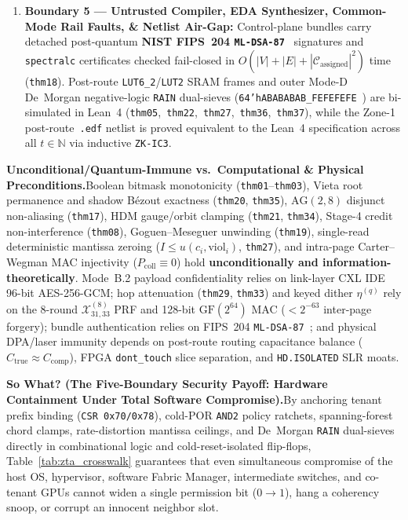 \documentclass[11pt,letterpaper]{article}
\theoremstyle{spectralthm}
\begin{document}
\begin{enumerate}
  \item \textbf{Boundary 5 --- Untrusted Compiler, EDA Synthesizer, Common-Mode Rail Faults, \& Netlist Air-Gap:} Control-plane bundles carry detached post-quantum \textbf{NIST FIPS~204 \texttt{ML-DSA-87}}~\cite{fips204mldsa} signatures and \texttt{spectralc} certificates checked fail-closed in $O(|V| \allowbreak+ |E| \allowbreak+ |\mathcal{C}_{\mathrm{assigned}}|^2)$ time (\texttt{thm18}). Post-route \mbox{\texttt{LUT6\_2}}/\texttt{LUT2} SRAM frames and outer Mode-D De~Morgan negative-logic \texttt{RAIN} dual-sieves (\texttt{64'hABABABAB\_FEFEFEFE}~\cite{mitra2000commonmode}) are bi-simulated in Lean~4 (\texttt{thm05},\allowbreak\ \texttt{thm22},\allowbreak\ \texttt{thm27},\allowbreak\ \texttt{thm36},\allowbreak\ \texttt{thm37}), while the Zone-1 post-route~\texttt{.edf} netlist is proved equivalent to the Lean~4 specification across all $t \in \mathbb{N}$ via inductive \texttt{ZK-IC3}.
\end{enumerate}

\noindent\textbf{Unconditional/Quantum-Immune vs.\ Computational \& Physical Preconditions.}\;Boolean bitmask monotonicity (\texttt{thm01}--\texttt{thm03}), Vieta root permanence and shadow B\'{e}zout exactness (\texttt{thm20}, \texttt{thm35}), $\mathrm{AG}(2,8)$ disjunct non-aliasing (\texttt{thm17}), HDM gauge/orbit clamping (\texttt{thm21}, \texttt{thm34}), Stage-4 credit non-interference (\texttt{thm08}), Goguen--Meseguer unwinding (\texttt{thm19}), single-read deterministic mantissa zeroing ($I \le u(c_i,\mathrm{viol}_i)$, \texttt{thm27}), and intra-page Carter--Wegman MAC injectivity ($P_{\mathrm{coll}} \equiv 0$) hold \textbf{unconditionally and information-theoretically}. Mode~B.2 payload confidentiality relies on link-layer CXL IDE 96-bit AES-256-GCM; hop attenuation (\texttt{thm29}, \texttt{thm33}) and keyed dither $\eta^{(q)}$ rely on the 8-round $\mathcal{X}_{31,33}^{(8)}$ PRF and 128-bit $\mathrm{GF}(2^{64})$ MAC ($<2^{-63}$ inter-page forgery); bundle authentication relies on FIPS~204 \texttt{ML-DSA-87}~\cite{fips204mldsa}; and physical DPA/laser immunity depends on post-route routing capacitance balance ($C_{\mathrm{true}} \approx C_{\mathrm{comp}}$), FPGA \texttt{dont\_touch} slice separation, and \texttt{HD.ISOLATED} SLR moats.

\noindent\textbf{So What? (The Five-Boundary Security Payoff: Hardware Containment Under Total Software Compromise).}\;By anchoring tenant prefix binding (\texttt{CSR 0x70/0x78}), cold-POR \texttt{AND2} policy ratchets, spanning-forest chord clamps, rate-distortion mantissa ceilings, and De~Morgan \texttt{RAIN} dual-sieves directly in combinational logic and cold-reset-isolated flip-flops, Table~\ref{tab:zta_crosswalk} guarantees that even simultaneous compromise of the host OS, hypervisor, software Fabric Manager, intermediate switches, and co-tenant GPUs cannot widen a single permission bit ($0 \rightarrow 1$), hang a coherency snoop, or corrupt an innocent neighbor slot.
\end{document}
